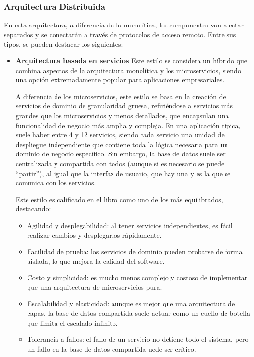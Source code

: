 \subsubsection{Arquitectura Distribuida}

En esta arquitectura, a diferencia de la monolítica, los componentes van a estar separados y se conectarán a través de 
protocolos de acceso remoto.
Entre sus tipos, se pueden destacar los siguientes:

\begin{itemize}
    \item \textbf{Arquitectura basada en servicios}
    \newline
    Este estilo se considera un híbrido que combina aspectos de la arquitectura monolítica y los microservicios, siendo 
    una opción extremadamente popular para aplicaciones empresariales. 

    A diferencia de los microservicios, este estilo se basa en la creación de servicios de dominio de granularidad gruesa, 
    refiriéndose a servicios más grandes que los microservicios y menos detallados, que encapsulan una funcionalidad de negocio 
    más amplia y compleja. En una aplicación típica, suele haber entre 4 y 12 servicios, siendo cada servicio una unidad de 
    despliegue independiente que contiene toda la lógica necesaria para un dominio de negocio específico. Sin embargo, la base 
    de datos suele ser centralizada y compartida con todos (aunque si es necesario se puede ``partir''), al igual que la interfaz 
    de usuario, que hay una y es la que se comunica con los servicios.

    Este estilo es calificado en el libro como uno de los más equilibrados, destacando:

    \begin{itemize}
        \item Agilidad y desplegabilidad: al tener servicios independientes, es fácil realizar cambios y desplegarlos 
        rápidamente.
        \item Facilidad de prueba: los servicios de dominio pueden probarse de forma aislada, lo que mejora la calidad 
        del software.
        \item Costo y simplicidad: es mucho menos complejo y costoso de implementar que una arquitectura de microservicios pura.
        \item Escalabilidad y elasticidad: aunque es mejor que una arquitectura de capas, la base de datos compartida suele actuar 
        como un cuello de botella que limita el escalado infinito.
        \item Tolerancia a fallos: el fallo de un servicio no detiene todo el sistema, pero un fallo en la base de datos compartida 
        uede ser crítico.
    \end{itemize}


\end{itemize}
